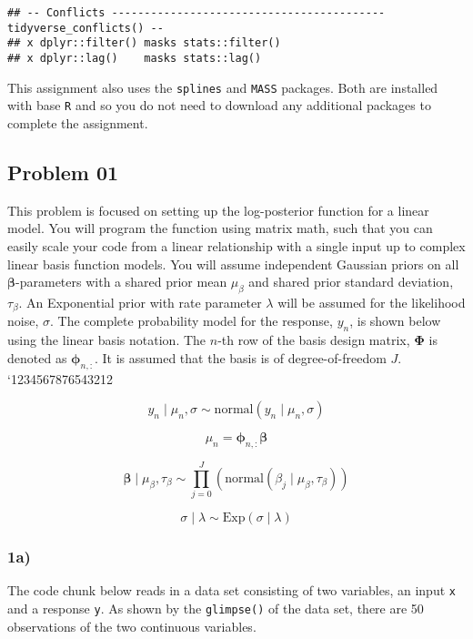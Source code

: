 \documentclass[
]{article}
\begin{document}
\begin{verbatim}
## -- Conflicts ------------------------------------------ tidyverse_conflicts() --
## x dplyr::filter() masks stats::filter()
## x dplyr::lag()    masks stats::lag()
\end{verbatim}

This assignment also uses the \texttt{splines} and \texttt{MASS}
packages. Both are installed with base \texttt{R} and so you do not need
to download any additional packages to complete the assignment.

\hypertarget{problem-01}{%
\subsection{Problem 01}\label{problem-01}}

This problem is focused on setting up the log-posterior function for a
linear model. You will program the function using matrix math, such that
you can easily scale your code from a linear relationship with a single
input up to complex linear basis function models. You will assume
independent Gaussian priors on all \(\boldsymbol{\beta}\)-parameters
with a shared prior mean \(\mu_{\beta}\) and shared prior standard
deviation, \(\tau_{\beta}\). An Exponential prior with rate parameter
\(\lambda\) will be assumed for the likelihood noise, \(\sigma\). The
complete probability model for the response, \(y_n\), is shown below
using the linear basis notation. The \(n\)-th row of the basis design
matrix, \(\boldsymbol{\Phi}\) is denoted as \(\boldsymbol{\phi}_{n,:}\).
It is assumed that the basis is of degree-of-freedom \(J\).
`1234567876543212

\[ 
y_n \mid \mu_n, \sigma \sim \mathrm{normal}\left(y_n \mid \mu_n, \sigma\right)
\]

\[ 
\mu_n = \boldsymbol{\phi}_{n,:}\boldsymbol{\beta}
\]

\[ 
\boldsymbol{\beta} \mid \mu_{\beta}, \tau_{\beta} \sim \prod_{j=0}^{J}\left( \mathrm{normal}\left( \beta_j \mid \mu_{\beta}, \tau_{\beta} \right) \right)
\]

\[ 
\sigma \mid \lambda \sim \mathrm{Exp}\left(\sigma \mid \lambda \right)
\]

\hypertarget{a}{%
\subsubsection{1a)}\label{a}}

The code chunk below reads in a data set consisting of two variables, an
input \texttt{x} and a response \texttt{y}. As shown by the
\texttt{glimpse()} of the data set, there are 50 observations of the two
continuous variables.
\end{document}
